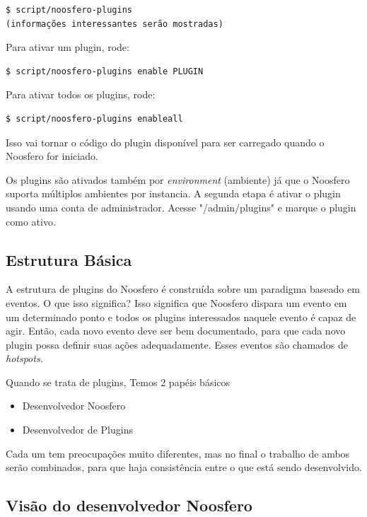 \documentclass[11pt]{article}
\begin{document}
\begin{Verbatim}[frame=single,fontfamily=courier]
$ script/noosfero-plugins
(informações interessantes serão mostradas)
\end{Verbatim}

Para ativar um plugin, rode:

\begin{Verbatim}[frame=single,fontfamily=courier]
$ script/noosfero-plugins enable PLUGIN
\end{Verbatim}

Para ativar todos os plugins, rode:

\begin{Verbatim}[frame=single,fontfamily=courier]
$ script/noosfero-plugins enableall
\end{Verbatim}

Isso vai tornar o código do plugin disponível para ser carregado quando o
Noosfero for iniciado.

Os plugins são ativados também por {\it environment} (ambiente) já que o
Noosfero suporta múltiplos ambientes por instancia. A segunda etapa é ativar o
plugin usando uma conta de administrador. Acesse "/admin/plugins" e marque o
plugin como ativo.

\subsection{Estrutura Básica}

A estrutura de plugins do Noosfero é construída sobre um paradigma baseado em
eventos. O que isso significa? Isso significa que Noosfero dispara um evento
em um determinado ponto e todos os plugins interessados naquele
evento é capaz de agir. Então, cada novo evento deve ser bem documentado, para
que cada novo plugin possa definir suas ações adequadamente. Esses eventos são
chamados de {\it hotspots}.

Quando se trata de plugins, Temos 2 papéis básicos

\begin{itemize}
  \item Desenvolvedor Noosfero
  \item Desenvolvedor de Plugins
\end{itemize}

Cada um tem preocupações muito diferentes, mas no final o trabalho de ambos
serão combinados, para que haja consistência entre o que está sendo
desenvolvido.

\subsection{Visão do desenvolvedor Noosfero}
\end{document}

